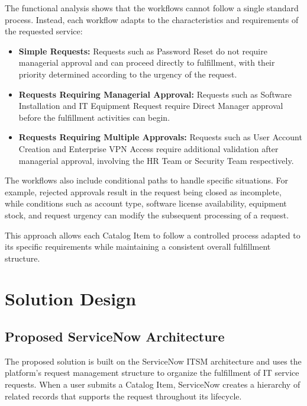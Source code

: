 \documentclass[12pt,a4paper]{report}
\begin{document}
The functional analysis shows that the workflows cannot follow a single
standard process. Instead, each workflow adapts to the characteristics and
requirements of the requested service:

\begin{itemize}

    \item \textbf{Simple Requests:} Requests such as Password Reset do not
    require managerial approval and can proceed directly to fulfillment,
    with their priority determined according to the urgency of the request.

    \item \textbf{Requests Requiring Managerial Approval:} Requests such as
    Software Installation and IT Equipment Request require Direct Manager
    approval before the fulfillment activities can begin.

    \item \textbf{Requests Requiring Multiple Approvals:} Requests such as
    User Account Creation and Enterprise VPN Access require additional
    validation after managerial approval, involving the HR Team or Security
    Team respectively.

\end{itemize}

The workflows also include conditional paths to handle specific situations.
For example, rejected approvals result in the request being closed as
incomplete, while conditions such as account type, software license
availability, equipment stock, and request urgency can modify the subsequent
processing of a request.

This approach allows each Catalog Item to follow a controlled process adapted
to its specific requirements while maintaining a consistent overall
fulfillment structure.

\section{Solution Design}

\subsection{Proposed ServiceNow Architecture}
The proposed solution is built on the ServiceNow ITSM architecture and uses the platform's request 
management structure to organize the fulfillment of IT service requests. When a user submits a 
Catalog Item, ServiceNow creates a hierarchy of related records that supports the request throughout 
its lifecycle.
\end{document}
